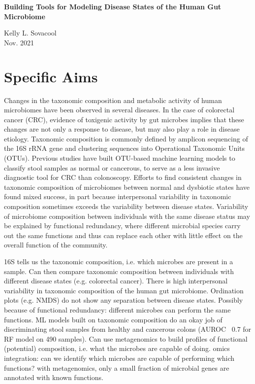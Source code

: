 \documentclass[11pt]{article}
\begin{document}
\sloppy
\begin{center}
\large{\textbf{
    Building Tools for Modeling Disease States of the Human Gut Microbiome
}}

\vspace{11pt}

\small{
    Kelly L. Sovacool \\
    Nov. 2021
}
\end{center}

\section*{Specific Aims}

Changes in the taxonomic composition and metabolic activity of human microbiomes have been observed in several diseases.
In the case of colorectal cancer (CRC), evidence of toxigenic activity by gut microbes implies that these changes are not only a response to disease, but may also play a role in disease etiology.
Taxonomic composition is commonly defined by amplicon sequencing of the 16S rRNA gene and clustering sequences into Operational Taxonomic Units (OTUs).
Previous studies have built OTU-based machine learning models to classify stool samples as normal or cancerous, to serve as a less invasive diagnostic tool for CRC than colonoscopy.
Efforts to find consistent changes in taxonomic composition of microbiomes between normal and dysbiotic states have found mixed success, in part because interpersonal variability in taxonomic composition sometimes exceeds the variability between disease states.
Variability of microbiome composition between individuals with the same disease status may be explained by functional redundancy, where different microbial species carry out the same functions and thus can replace each other with little effect on the overall function of the community.

16S tells us the taxonomic composition, i.e. which microbes are present in a sample.
Can then compare taxonomic composition between individuals with different disease states (e.g. colorectal cancer).
There is high interpersonal variability in taxonomic composition of the human gut microbiome. Ordination plots (e.g. NMDS) do not show any separation between disease states. Possibly because of functional redundancy: different microbes can perform the same functions.
ML models built on taxonomic composition do an okay job of discriminating stool samples from healthy and cancerous colons (AUROC ~0.7 for RF model on 490 samples).
Can use metagenomics to build profiles of functional (potential) composition, i.e. what the microbes are capable of doing.
omics integration: can we identify which microbes are capable of performing which functions?
with metagenomics, only a small fraction of microbial genes are annotated with known functions.
\end{document}
